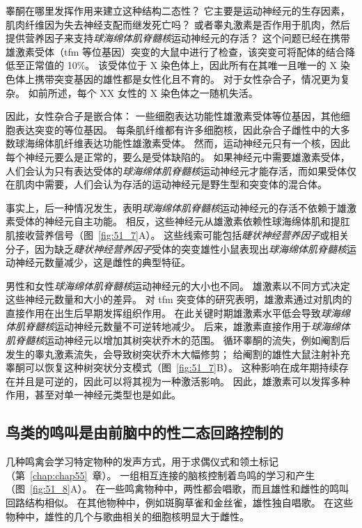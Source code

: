 睾酮在哪里发挥作用来建立这种结构二态性？
它主要是运动神经元的生存因素，肌肉纤维因为失去神经支配而继发死亡吗？
或者睾丸激素是否作用于肌肉，然后提供营养因子来支持\textit{球海绵体肌脊髓核}运动神经元的存活？
这个问题已经在携带雄激素受体（tfm 等位基因）突变的大鼠中进行了检查，该突变可将配体的结合降低至正常值的 10\%。
该受体位于 X 染色体上，因此所有在其唯一且唯一的 X 染色体上携带突变基因的雄性都是女性化且不育的。
对于女性杂合子，情况更为复杂。
如前所述，每个 XX 女性的 X 染色体之一随机失活。


因此，女性杂合子是嵌合体：
一些细胞表达功能性雄激素受体等位基因，其他细胞表达突变的等位基因。
每条肌纤维都有许多细胞核，因此杂合子雌性中的大多数球海绵体肌纤维表达功能性雄激素受体。
然而，运动神经元只有一个核，因此每个神经元要么是正常的，要么是受体缺陷的。
如果神经元中需要雄激素受体，人们会认为只有表达受体的\textit{球海绵体肌脊髓核}运动神经元才能存活，而如果受体仅在肌肉中需要，人们会认为存活的运动神经元是野生型和突变体的混合体。


事实上，后一种情况发生，表明\textit{球海绵体肌脊髓核}运动神经元的存活不依赖于雄激素受体的神经元自主功能。
相反，这些神经元从雄激素依赖性球海绵体肌和提肛肌接收营养信号（图~\ref{fig:51_7}A）。
这些线索可能包括\textit{睫状神经营养因子}或相关分子，因为缺乏\textit{睫状神经营养因子}受体的突变雄性小鼠表现出\textit{球海绵体肌脊髓核}运动神经元数量减少，这是雌性的典型特征。


男性和女性\textit{球海绵体肌脊髓核}运动神经元的大小也不同。
雄激素以不同方式决定这些神经元数量和大小的差异。
对 tfm 突变体的研究表明，雄激素通过对肌肉的直接作用在出生后早期发挥组织作用。
在此关键时期雄激素水平低会导致\textit{球海绵体肌脊髓核}运动神经元数量不可逆转地减少。
后来，雄激素直接作用于\textit{球海绵体肌脊髓核}运动神经元以增加其树突状乔木的范围。
循环睾酮的流失，例如阉割后发生的睾丸激素流失，会导致树突状乔木大幅修剪；
给阉割的雄性大鼠注射补充睾酮可以恢复这种树突状分支模式（图~\ref{fig:51_7}B）。
这种影响在成年期持续存在并且是可逆的，因此可以将其视为一种激活影响。
因此，雄激素可以发挥多种作用，甚至对单一神经元类型也是如此。



\subsection{鸟类的鸣叫是由前脑中的性二态回路控制的}

几种鸣禽会学习特定物种的发声方式，用于求偶仪式和领土标记（第~\ref{chap:chap55}~章）。
一组相互连接的脑核控制着鸟鸣的学习和产生（图~\ref{fig:51_8}A）。
在一些鸣禽物种中，两性都会唱歌，而且雄性和雌性的鸣叫回路结构相似。
在其他物种中，例如斑胸草雀和金丝雀，雄性独自唱歌。
在这些物种中，雄性的几个与歌曲相关的细胞核明显大于雌性。


